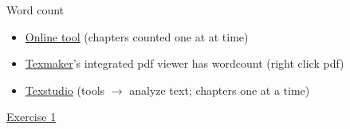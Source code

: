 \begin{frame}{Word count}
  \begin{itemize}
    \item \href{http://app.uio.no/ifi/texcount/online.php}{Online tool}
      (chapters counted one at at time)
    \item \href{http://www.xm1math.net/texmaker/}{Texmaker}'s integrated pdf
       viewer has wordcount (right click pdf)
    \item \href{https://www.texstudio.org/}{Texstudio} (tools $\rightarrow$
      analyze text; chapters one at a time)
  \end{itemize}
\end{frame}

\begin{frame}[standout]
  \href{https://jwalton.info/assets/teaching/latex/exercise_1.pdf}%
  {\color{white}Exercise 1}
\end{frame}
